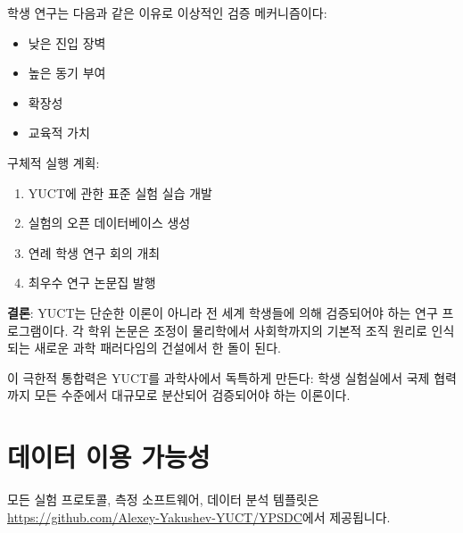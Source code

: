 \documentclass[12pt,a4paper]{article}
\begin{document}
	학생 연구는 다음과 같은 이유로 이상적인 검증 메커니즘이다:
	\begin{itemize}
		\item 낮은 진입 장벽
		\item 높은 동기 부여
		\item 확장성
		\item 교육적 가치
	\end{itemize}
	
	구체적 실행 계획:
	\begin{enumerate}
		\item YUCT에 관한 표준 실험 실습 개발
		\item 실험의 오픈 데이터베이스 생성
		\item 연례 학생 연구 회의 개최
		\item 최우수 연구 논문집 발행
	\end{enumerate}
	
	\textbf{결론}: YUCT는 단순한 이론이 아니라 전 세계 학생들에 의해 검증되어야 하는 연구 프로그램이다. 각 학위 논문은 조정이 물리학에서 사회학까지의 기본적 조직 원리로 인식되는 새로운 과학 패러다임의 건설에서 한 돌이 된다.
	
	이 극한적 통합력은 YUCT를 과학사에서 독특하게 만든다: 학생 실험실에서 국제 협력까지 모든 수준에서 대규모로 분산되어 검증되어야 하는 이론이다.
	
	\section*{데이터 이용 가능성}
	모든 실험 프로토콜, 측정 소프트웨어, 데이터 분석 템플릿은 \url{https://github.com/Alexey-Yakushev-YUCT/YPSDC}에서 제공됩니다.
	
\end{document}
